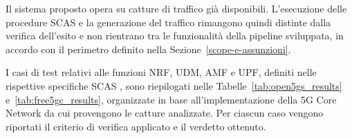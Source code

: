 Il sistema proposto opera su catture di traffico già disponibili. L'esecuzione delle procedure SCAS e la generazione del traffico rimangono quindi distinte dalla verifica dell'esito e non rientrano tra le funzionalità della pipeline sviluppata, in accordo con il perimetro definito nella Sezione~\ref{scope-e-assunzioni}.

I casi di test relativi alle funzioni NRF, UDM, AMF e UPF, definiti nelle rispettive specifiche SCAS \cite{3gpp_ts33518_2024,3gpp_ts33514_2021,3gpp_ts33512_2022,3gpp_ts33513_2023}, sono riepilogati nelle Tabelle~\ref{tab:open5gs_results} e~\ref{tab:free5gc_results}, organizzate in base all'implementazione della 5G Core Network da cui provengono le catture analizzate. Per ciascun caso vengono riportati il criterio di verifica applicato e il verdetto ottenuto.


